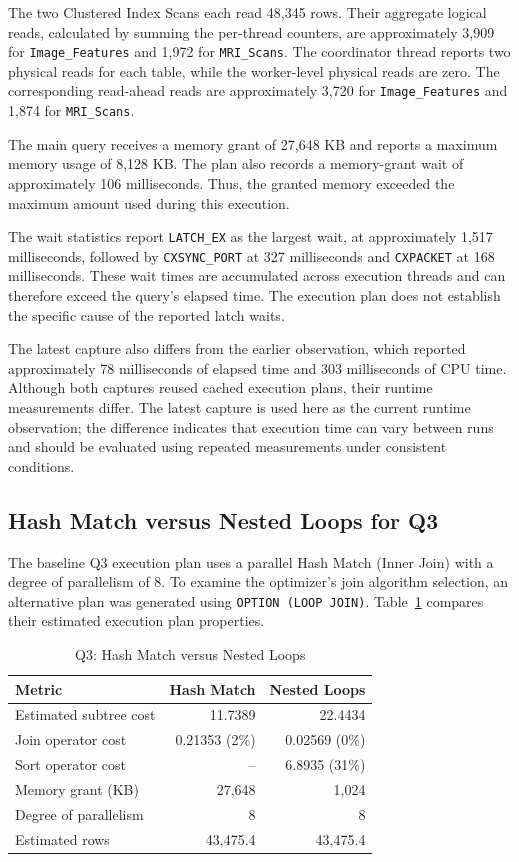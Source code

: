 The two Clustered Index Scans each read 48,345 rows. Their aggregate logical reads, calculated by summing the per-thread counters, are approximately 3,909 for \texttt{Image\_Features} and 1,972 for \texttt{MRI\_Scans}. The coordinator thread reports two physical reads for each table, while the worker-level physical reads are zero. The corresponding read-ahead reads are approximately 3,720 for \texttt{Image\_Features} and 1,874 for \texttt{MRI\_Scans}.

The main query receives a memory grant of 27,648 KB and reports a maximum memory usage of 8,128 KB. The plan also records a memory-grant wait of approximately 106 milliseconds. Thus, the granted memory exceeded the maximum amount used during this execution.

The wait statistics report \texttt{LATCH\_EX} as the largest wait, at approximately 1,517 milliseconds, followed by \texttt{CXSYNC\_PORT} at 327 milliseconds and \texttt{CXPACKET} at 168 milliseconds. These wait times are accumulated across execution threads and can therefore exceed the query's elapsed time. The execution plan does not establish the specific cause of the reported latch waits.

The latest capture also differs from the earlier observation, which reported approximately 78 milliseconds of elapsed time and 303 milliseconds of CPU time. Although both captures reused cached execution plans, their runtime measurements differ. The latest capture is used here as the current runtime observation; the difference indicates that execution time can vary between runs and should be evaluated using repeated measurements under consistent conditions.

\subsection{Hash Match versus Nested Loops for Q3}

The baseline Q3 execution plan uses a parallel Hash Match (Inner Join) with a degree of parallelism of 8. To examine the optimizer's join algorithm selection, an alternative plan was generated using \texttt{OPTION (LOOP JOIN)}. Table~\ref{tab:q3-join-comparison} compares their estimated execution plan properties.

\begin{table}[htbp]
\centering
\caption{Q3: Hash Match versus Nested Loops}
\label{tab:q3-join-comparison}
\begin{tabular}{lrr}
\toprule
Metric & Hash Match & Nested Loops \\
\midrule
Estimated subtree cost & 11.7389 & 22.4434 \\
Join operator cost & 0.21353 (2\%) & 0.02569 (0\%) \\
Sort operator cost & -- & 6.8935 (31\%) \\
Memory grant (KB) & 27,648 & 1,024 \\
Degree of parallelism & 8 & 8 \\
Estimated rows & 43,475.4 & 43,475.4 \\
\bottomrule
\end{tabular}
\end{table}

